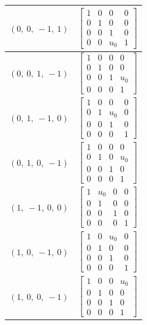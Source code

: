 \documentclass[11pt]{article}
\theoremstyle{definition}
\begin{document}
\begin{tabular}{|l|c|}
    \hline
    $\left( 0, \  0, \  -1, \  1\right)$ & $\left[\begin{matrix}1 & 0 & 0 & 0\\0 & 1 & 0 & 0\\0 & 0 & 1 & 0\\0 & 0 & u_{0} & 1\end{matrix}\right]$ \\
    \hline
    $\left( 0, \  0, \  1, \  -1\right)$ & $\left[\begin{matrix}1 & 0 & 0 & 0\\0 & 1 & 0 & 0\\0 & 0 & 1 & u_{0}\\0 & 0 & 0 & 1\end{matrix}\right]$ \\
    \hline
    $\left( 0, \  1, \  -1, \  0\right)$ & $\left[\begin{matrix}1 & 0 & 0 & 0\\0 & 1 & u_{0} & 0\\0 & 0 & 1 & 0\\0 & 0 & 0 & 1\end{matrix}\right]$ \\
    \hline
    $\left( 0, \  1, \  0, \  -1\right)$ & $\left[\begin{matrix}1 & 0 & 0 & 0\\0 & 1 & 0 & u_{0}\\0 & 0 & 1 & 0\\0 & 0 & 0 & 1\end{matrix}\right]$ \\
    \hline
    $\left( 1, \  -1, \  0, \  0\right)$ & $\left[\begin{matrix}1 & u_{0} & 0 & 0\\0 & 1 & 0 & 0\\0 & 0 & 1 & 0\\0 & 0 & 0 & 1\end{matrix}\right]$ \\
    \hline
    $\left( 1, \  0, \  -1, \  0\right)$ & $\left[\begin{matrix}1 & 0 & u_{0} & 0\\0 & 1 & 0 & 0\\0 & 0 & 1 & 0\\0 & 0 & 0 & 1\end{matrix}\right]$ \\
    \hline
    $\left( 1, \  0, \  0, \  -1\right)$ & $\left[\begin{matrix}1 & 0 & 0 & u_{0}\\0 & 1 & 0 & 0\\0 & 0 & 1 & 0\\0 & 0 & 0 & 1\end{matrix}\right]$ \\
    \hline
\end{tabular}
\end{document}
